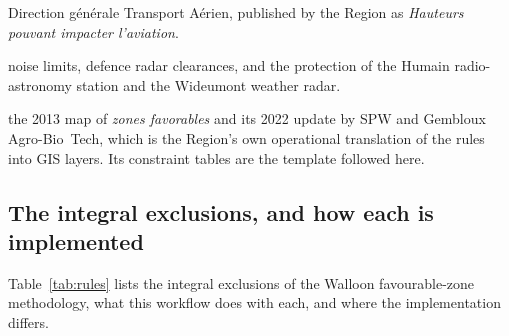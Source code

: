 \documentclass[11pt,a4paper]{article}
\begin{document}
\begin{description}
    Direction générale Transport Aérien, published by the Region as
    \emph{Hauteurs pouvant impacter l'aviation}.
  \item[Sectoral conditions and permitting practice] noise limits, defence
    radar clearances, and the protection of the Humain radio-astronomy station
    and the Wideumont weather radar.
  \item[The Walloon favourable-zone cartography] the 2013 map of \emph{zones
    favorables} and its 2022 update by SPW and Gembloux Agro-Bio~Tech, which is
    the Region's own operational translation of the rules into GIS layers. Its
    constraint tables are the template followed here.
\end{description}

\subsection{The integral exclusions, and how each is implemented}

Table~\ref{tab:rules} lists the integral exclusions of the Walloon
favourable-zone methodology, what this workflow does with each, and where the
implementation differs.
\end{document}
